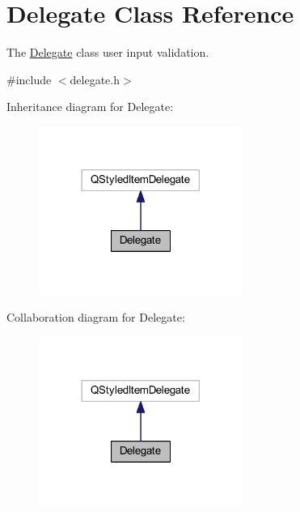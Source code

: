 \hypertarget{class_delegate}{}\section{Delegate Class Reference}
\label{class_delegate}


The \hyperlink{class_delegate}{Delegate} class user input validation.  




{\ttfamily \#include $<$delegate.\+h$>$}



Inheritance diagram for Delegate\+:
\nopagebreak
\begin{figure}[H]
\begin{center}
\leavevmode
\includegraphics[width=189pt]{class_delegate__inherit__graph}
\end{center}
\end{figure}


Collaboration diagram for Delegate\+:
\nopagebreak
\begin{figure}[H]
\begin{center}
\leavevmode
\includegraphics[width=189pt]{class_delegate__coll__graph}
\end{center}
\end{figure}

